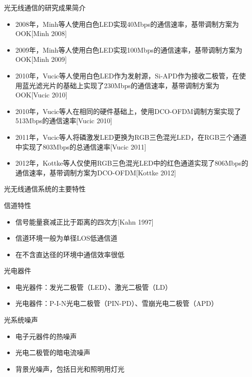 \documentclass[mathserif, utf8, 9pt]{beamer}
\begin{document}
\begin{frame}{光无线通信的研究成果简介}
\begin{itemize}
\item 2008年，Minh等人使用白色LED实现\alert{40Mbps}的通信速率，基带调制方案为OOK[Minh 2008]
\item 2009年，Minh等人使用白色LED实现\alert{100Mbps}的通信速率，基带调制方案为OOK[Minh 2009]
\item 2010年，Vucic等人使用白色LED作为发射源，Si-APD作为接收二极管，在使用蓝光滤光片的基础上实现了\alert{230Mbps}的通信速率，基带调制方案为OOK[Vucic 2010]
\item 2010年，Vucic等人在相同的硬件基础上，使用DCO-OFDM调制方案实现了\alert{513Mbps}的通信速率[Vucic 2010]
\item 2011年，Vucic等人将磷激发LED更换为RGB三色混光LED，在RGB三个通道中实现了\alert{803Mbps}的总通信速率[Vucic 2011]
\item 2012年，Kottke等人仅使用RGB三色混光LED中的红色通道实现了\alert{806Mbps}的通信速率，基带调制方案为DCO-OFDM[Kottke 2012]
\end{itemize}
\end{frame}

\begin{frame}{光无线通信系统的主要特性}
    \vspace{-0.5em}
    \begin{block}{信道特性}
        \begin{itemize}
        \item 信号能量衰减正比于距离的\alert{四次方}[Kahn 1997]
        \item 信道环境一般为\alert{单径LOS低通信道}
        \item 在不含直达径的环境中通信效率很低
        \end{itemize}
    \end{block}
    \pause
    \vspace{-0.5em}
    \begin{block}{光电器件}
        \begin{itemize}
        \item 电光器件：\alert{发光二极管（LED）}、激光二极管（LD）
        \item 光电器件：P-I-N光电二极管（PIN-PD）、雪崩光电二极管（APD）
        \end{itemize}
    \end{block}
    \pause
    \vspace{-0.5em}
    \begin{block}{光系统噪声}
        \begin{itemize}
        \item 电子元器件的\alert{热噪声}
        \item 光电二极管的\alert{暗电流噪声}
        \item \alert{背景光噪声}，包括日光和照明用灯光
        \end{itemize}
    \end{block}
\end{frame}
\end{document}

